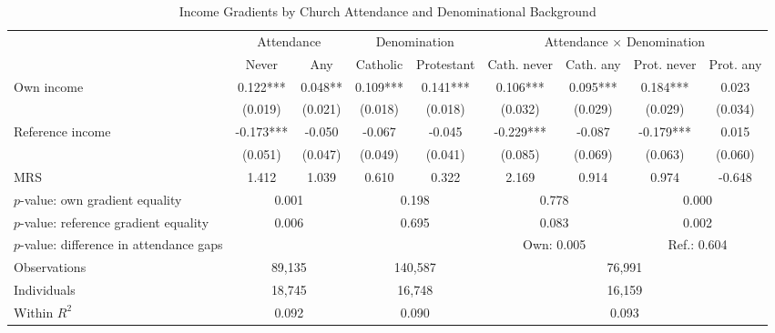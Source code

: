\begin{table}[!htbp]
\centering
\caption{Income Gradients by Church Attendance and Denominational Background}
\label{tab:income_gradients_attendance_denomination}
\begingroup
\scriptsize
\setlength{\tabcolsep}{5.2pt}
\renewcommand{\arraystretch}{1.14}
\begin{adjustbox}{max width=1.00\textwidth,center}
\begin{tabular}{lcccccccc}
\toprule
 & \multicolumn{2}{c}{Attendance} & \multicolumn{2}{c}{Denomination} & \multicolumn{4}{c}{Attendance $\times$ Denomination} \\
\cmidrule(lr){2-3}\cmidrule(lr){4-5}\cmidrule(lr){6-9}
 & Never & Any & Catholic & Protestant & Cath. never & Cath. any & Prot. never & Prot. any \\
\midrule
Own income & 0.122*** & 0.048** & 0.109*** & 0.141*** & 0.106*** & 0.095*** & 0.184*** & 0.023 \\
 & (0.019) & (0.021) & (0.018) & (0.018) & (0.032) & (0.029) & (0.029) & (0.034) \\
Reference income & -0.173*** & -0.050 & -0.067 & -0.045 & -0.229*** & -0.087 & -0.179*** & 0.015 \\
 & (0.051) & (0.047) & (0.049) & (0.041) & (0.085) & (0.069) & (0.063) & (0.060) \\
MRS & 1.412 & 1.039 & 0.610 & 0.322 & 2.169 & 0.914 & 0.974 & -0.648 \\
\addlinespace[0.25em]
\(p\)-value: own gradient equality & \multicolumn{2}{c}{0.001} & \multicolumn{2}{c}{0.198} & \multicolumn{2}{c}{0.778} & \multicolumn{2}{c}{0.000} \\
\(p\)-value: reference gradient equality & \multicolumn{2}{c}{0.006} & \multicolumn{2}{c}{0.695} & \multicolumn{2}{c}{0.083} & \multicolumn{2}{c}{0.002} \\
\(p\)-value: difference in attendance gaps &  &  &  &  & \multicolumn{2}{c}{Own: 0.005} & \multicolumn{2}{c}{Ref.: 0.604} \\
\midrule
Observations & \multicolumn{2}{c}{89,135} & \multicolumn{2}{c}{140,587} & \multicolumn{4}{c}{76,991} \\
Individuals & \multicolumn{2}{c}{18,745} & \multicolumn{2}{c}{16,748} & \multicolumn{4}{c}{16,159} \\
Within \(R^2\) & \multicolumn{2}{c}{0.092} & \multicolumn{2}{c}{0.090} & \multicolumn{4}{c}{0.093} \\
\bottomrule
\end{tabular}
\end{adjustbox}
\vspace{0.45em}

\end{table}
